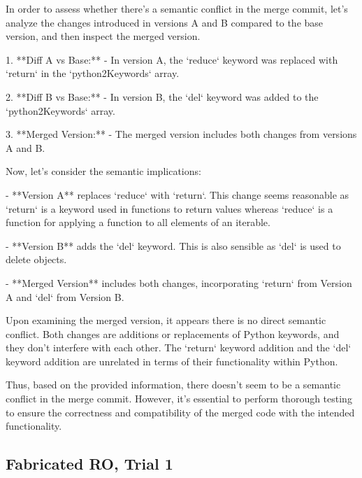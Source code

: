 \begin{response}
  In order to assess whether there's a semantic conflict in the merge commit, let's analyze the changes introduced in versions A and B compared to the base version, and then inspect the merged version.

  1. **Diff A vs Base:**
     - In version A, the `reduce` keyword was replaced with `return` in the `python2Keywords` array.
  
  2. **Diff B vs Base:**
     - In version B, the `del` keyword was added to the `python2Keywords` array.
  
  3. **Merged Version:**
     - The merged version includes both changes from versions A and B.
  
  Now, let's consider the semantic implications:
  
  - **Version A** replaces `reduce` with `return`. This change seems reasonable as `return` is a keyword used in functions to return values whereas `reduce` is a function for applying a function to all elements of an iterable.
    
  - **Version B** adds the `del` keyword. This is also sensible as `del` is used to delete objects.
  
  - **Merged Version** includes both changes, incorporating `return` from Version A and `del` from Version B.
  
  Upon examining the merged version, it appears there is no direct semantic conflict. Both changes are additions or replacements of Python keywords, and they don't interfere with each other. The `return` keyword addition and the `del` keyword addition are unrelated in terms of their functionality within Python.
  
  Thus, based on the provided information, there doesn't seem to be a semantic conflict in the merge commit. However, it's essential to perform thorough testing to ensure the correctness and compatibility of the merged code with the intended functionality.
\end{response}

\subsection{Fabricated RO, Trial 1}

